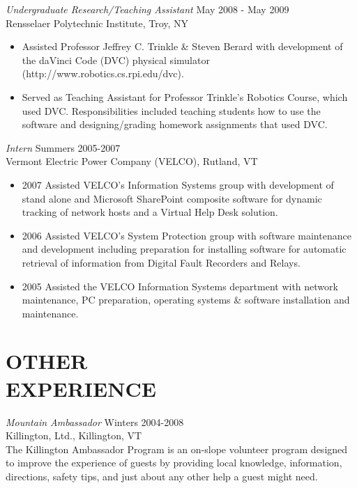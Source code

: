 \documentclass[line,margin]{res}
\begin{document}
\begin{resume}
  {\sl Undergraduate Research/Teaching Assistant} \hfill May 2008 - May 2009 \\
  Rensselaer Polytechnic Institute, Troy, NY\\
  \begin{itemize}  \itemsep -2pt %
  \item Assisted Professor Jeffrey C. Trinkle \& Steven Berard with development of the daVinci Code (DVC) physical simulator (http://www.robotics.cs.rpi.edu/dvc).
  \item Served as Teaching Assistant for Professor Trinkle's Robotics Course, which used DVC.
    Responsibilities included teaching students how to use the software and designing/grading homework assignments that used DVC.
  \end{itemize}

  {\sl Intern} \hfill            Summers 2005-2007 \\
  Vermont Electric Power Company (VELCO), Rutland, VT \\
  \begin{itemize}  \itemsep -2pt %
  \item{2007} Assisted VELCO's Information Systems group with development of stand alone and Microsoft SharePoint composite software for dynamic tracking of network hosts and a Virtual Help Desk solution.
  \item{2006}
    Assisted VELCO's System Protection group with software maintenance and development including preparation for installing software for automatic retrieval of information from Digital Fault Recorders and Relays.
  \item{2005}
    Assisted the VELCO Information Systems department with network maintenance, PC preparation, operating systems \& software installation and maintenance.
  \end{itemize} 

  \section{OTHER\\ EXPERIENCE}             
  {\it Mountain Ambassador} \hfill Winters 2004-2008\\
  Killington, Ltd., Killington, VT \\
  The Killington Ambassador Program is an on-slope volunteer program designed to improve the experience of guests by providing local knowledge, information, directions, safety tips, and just about any other help a guest might need.


\end{resume}
\end{document}
